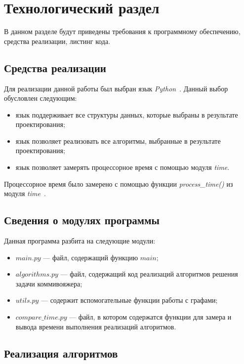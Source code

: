 \chapter{Технологический раздел}

В данном разделе будут приведены требования к программному обеспечению, средства реализации, листинг кода.


\section{Средства реализации}

Для реализации данной работы был выбран язык \textit{Python}~\cite{python}.
Данный выбор обусловлен следующим:
\begin{itemize}
	\item язык поддерживает все структуры данных, которые выбраны в результате проектирования;
	\item язык позволяет реализовать все алгоритмы, выбранные в результате проектирования;
	\item язык позволяет замерять процессорное время с помощью модуля \textit{time}. 
\end{itemize}

Процессорное время было замерено с помощью функции \textit{process\_time()} из модуля \textit{time}~\cite{python-time}.

\section{Сведения о модулях программы}

Данная программа разбита на следующие модули:
\begin{itemize}
	\item $main.py$ --- файл, содержащий функцию $main$;
	\item $algorithms.py$ --- файл, содержащий код реализаций алгоритмов решения задачи коммивояжера;
	\item $utils.py$ --- содержит вспомогательные функции работы с графами;
	\item $compare\_time.py$ --- файл, в котором содержатся функции для замера и вывода времени выполнения реализаций алгоритмов.
\end{itemize}

\section{Реализация алгоритмов}

